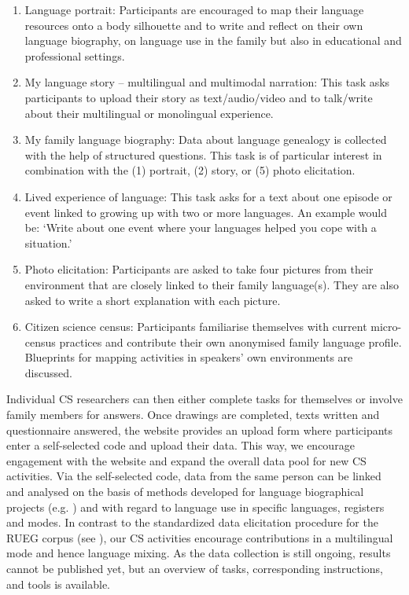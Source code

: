 \documentclass[output=paper,colorlinks,citecolor=brown]{langscibook}
\begin{document}
\begin{enumerate}
\item Language portrait: Participants are encouraged to map their language resources onto a body silhouette and to write and reflect on their own language biography, on language use in the family but also in educational and professional settings.
\item My language story – multilingual and multimodal narration: This task asks participants to upload their story as text/audio/video and to talk/write about their multilingual or monolingual experience.
\item My family language biography: Data about language genealogy is collected with the help of structured questions. This task is of particular interest in combination with the (1) portrait, (2) story, or (5) photo elicitation.
\item Lived experience of language: This task asks for a text about one episode or event linked to growing up with two or more languages. An example would be: ‘Write about one event where your languages helped you cope with a situation.’
\item Photo elicitation: Participants are asked to take four pictures from their environment that are closely linked to their family language(s). They are also asked to write a short explanation with each picture.
\item Citizen science census: Participants familiarise themselves with current micro-census practices and contribute their own anonymised family language profile. Blueprints for mapping activities in speakers’ own environments are discussed.
\end{enumerate}

Individual CS researchers can then either complete tasks for themselves or involve family members for answers. Once drawings are completed, texts written and questionnaire answered, the website provides an upload form where participants enter a self-selected code and upload their data. This way, we encourage engagement with the website and expand the overall data pool for new CS activities.
Via the self-selected code, data from the same person can be linked and analysed on the basis of methods developed for language biographical projects (e.g. \cite{Purkarthofer2016}) and with regard to language use in specific languages, registers and modes. In contrast to the standardized data elicitation procedure for the RUEG corpus (see \cite{chapters/02}), our CS activities encourage contributions in a multilingual mode and hence language mixing. As the data collection is still ongoing, results cannot be published yet, but an overview of tasks, corresponding instructions, and tools is available.
\end{document}

